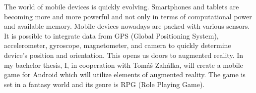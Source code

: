 The world of mobile devices is quickly evolving. Smartphones and tablets are becoming
more and more powerful and not only in terms of computational power and available memory.
Mobile devices nowadays are packed with various sensors. It is possible to integrate
data from GPS (Global Positioning System), accelerometer, gyroscope, magnetometer, and
camera to quickly determine device’s position and orientation. This opens us doors to augmented
reality.
In my bachelor thesis, I, in cooperation with Tomáš Zahálka, will create a mobile game
for Android which will utilize elements of augmented reality. The game is set in a fantasy
world and its genre is RPG (Role Playing Game).

